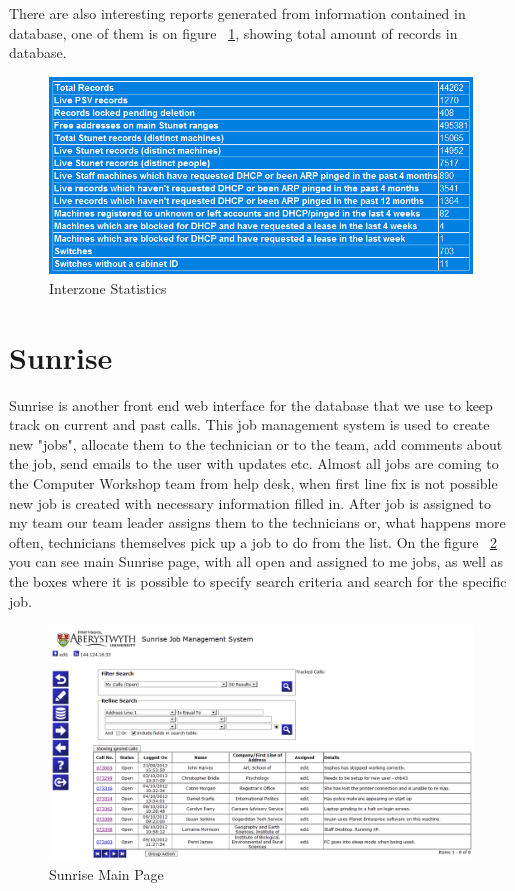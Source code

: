 \documentclass[10pt,a4paper,headinclude=true]{report}
\begin{document}
There are also interesting reports generated from information contained in database, one of them is on figure ~\ref{fig:interzone_statistics}, showing total amount of records in database.

\begin{figure}[H]
\centering
\centerline{\includegraphics[scale=0.5]{./interzone_statistics}}
\caption{Interzone Statistics}
\label{fig:interzone_statistics}
\end{figure}

\section{Sunrise}
Sunrise is another front end web interface for the database that we use to keep track on current and past calls. This job management system is used to create new "jobs", allocate them to the technician or to the team, add comments about the job, send emails to the user with updates etc. Almost all jobs are coming to the Computer Workshop team from help desk, when first line fix is not possible new job is created with necessary information filled in. After job is assigned to my team our team leader assigns them to the technicians or, what happens more often, technicians themselves pick up a job to do from the list. On the figure ~\ref{fig:sunrise_main} you can see main Sunrise page, with all open and assigned to me jobs, as well as the boxes where it is possible to specify search criteria and search for the specific job.

\begin{figure}[H]
\centering
\centerline{\includegraphics[scale=0.5]{./sunrise_main}}
\caption{Sunrise Main Page}
\label{fig:sunrise_main}
\end{figure}
\end{document}

